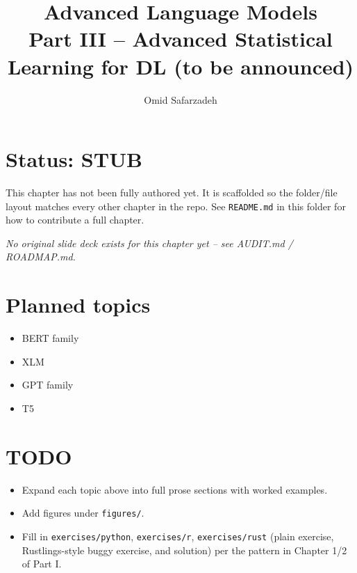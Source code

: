 \documentclass[11pt]{article}
\title{Advanced Language Models \\ \large Part III -- Advanced Statistical Learning for DL (to be announced)}
\author{Omid Safarzadeh}
\date{}
\begin{document}
\maketitle

\section*{Status: STUB}
This chapter has not been fully authored yet. It is scaffolded so the
folder/file layout matches every other chapter in the repo. See
\texttt{README.md} in this folder for how to contribute a full chapter.

\textit{No original slide deck exists for this chapter yet -- see AUDIT.md / ROADMAP.md.}



\section*{Planned topics}
\begin{itemize}
  \item BERT family
  \item XLM
  \item GPT family
  \item T5
\end{itemize}

\section*{TODO}
\begin{itemize}
  \item Expand each topic above into full prose sections with worked examples.
  \item Add figures under \texttt{figures/}.
  \item Fill in \texttt{exercises/python}, \texttt{exercises/r}, \texttt{exercises/rust}
        (plain exercise, Rustlings-style buggy exercise, and solution) per the
        pattern in Chapter 1/2 of Part I.
\end{itemize}
\end{document}
